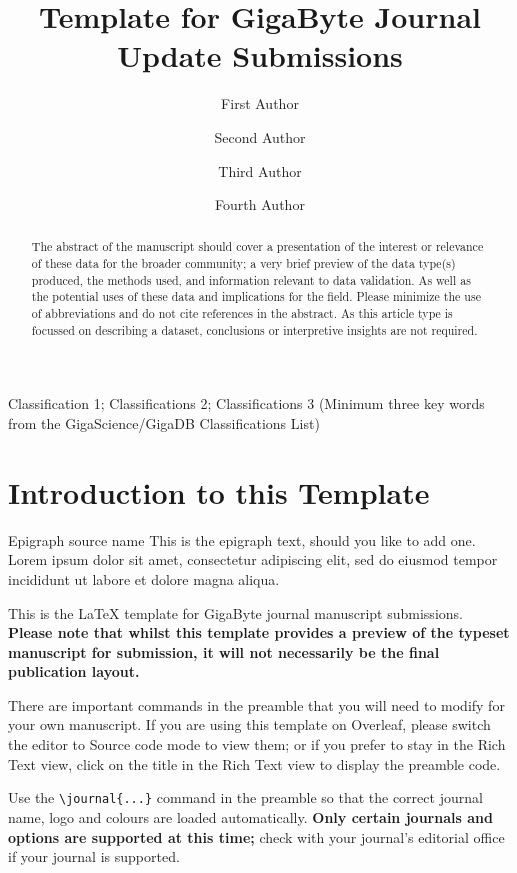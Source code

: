 \documentclass[a4paper,num-refs,gigabyte]{oup-contemporary}
\title{Template for GigaByte Journal Update Submissions}
\author[1,\authfn{1},\authfn{2}]{First Author}
\author[2,\authfn{1},\authfn{2}]{Second Author}
\author[2]{Third Author}
\author[2,\authfn{1}]{Fourth Author}
\affil[1]{First Institution}
\affil[2]{Second Institution}
\begin{document}
\begin{frontmatter}
\maketitle
\begin{abstract}
The abstract of the manuscript should cover a presentation of the interest or relevance of these data for the broader community; 
a very brief preview of the data type(s) produced, the methods used, and information relevant to data validation. 
As well as the potential uses of these data and implications for the field. Please minimize the use of abbreviations and 
do not cite references in the abstract. As this article type is focussed on describing a dataset, conclusions or interpretive 
insights are not required.
\end{abstract}

\begin{classifications}
Classification 1; Classifications 2; Classifications 3 (Minimum three key words from the GigaScience/GigaDB Classifications List)
\end{classifications}
\end{frontmatter}

\section{Introduction to this Template}

\begin{epigraph}{Epigraph source name}
This is the epigraph text, should you like to add one. Lorem ipsum dolor sit amet, consectetur adipiscing elit, sed do eiusmod tempor incididunt ut labore et dolore magna aliqua. 
\end{epigraph}

This is the \LaTeX{} template for GigaByte journal manuscript submissions. \textbf{Please note that whilst this template provides a preview of the typeset manuscript for submission, it will not necessarily be the final publication layout.}

There are important commands in the preamble that you will need to modify for your own manuscript. If you are using this template on Overleaf, please switch the editor to Source code mode to view them; or if you prefer to stay in the Rich Text view, click on the title in the Rich Text view to display the preamble code.

Use the \verb|\journal{...}| command in the preamble so that the correct journal name, logo and colours are loaded automatically. \textbf{Only certain journals and options are supported at this time;} check with your journal's editorial office if your journal is supported.
\end{document}

